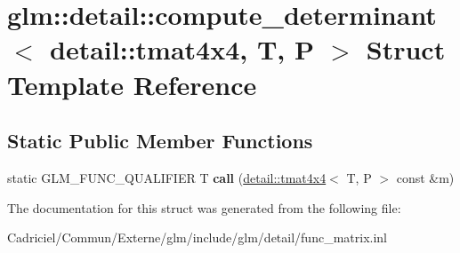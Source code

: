 \hypertarget{structglm_1_1detail_1_1compute__determinant_3_01detail_1_1tmat4x4_00_01_t_00_01_p_01_4}{}\section{glm\+:\+:detail\+:\+:compute\+\_\+determinant$<$ detail\+:\+:tmat4x4, T, P $>$ Struct Template Reference}
\label{structglm_1_1detail_1_1compute__determinant_3_01detail_1_1tmat4x4_00_01_t_00_01_p_01_4}
\subsection*{Static Public Member Functions}
\begin{DoxyCompactItemize}
\item 
static G\+L\+M\+\_\+\+F\+U\+N\+C\+\_\+\+Q\+U\+A\+L\+I\+F\+I\+ER T {\bfseries call} (\hyperlink{structglm_1_1detail_1_1tmat4x4}{detail\+::tmat4x4}$<$ T, P $>$ const \&m)\hypertarget{structglm_1_1detail_1_1compute__determinant_3_01detail_1_1tmat4x4_00_01_t_00_01_p_01_4_aa7fa7eae68f9b10c3ac3a80bca669c98}{}\label{structglm_1_1detail_1_1compute__determinant_3_01detail_1_1tmat4x4_00_01_t_00_01_p_01_4_aa7fa7eae68f9b10c3ac3a80bca669c98}

\end{DoxyCompactItemize}


The documentation for this struct was generated from the following file\+:\begin{DoxyCompactItemize}
\item 
Cadriciel/\+Commun/\+Externe/glm/include/glm/detail/func\+\_\+matrix.\+inl\end{DoxyCompactItemize}
